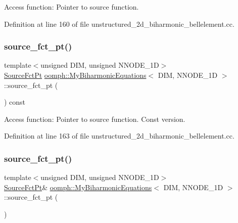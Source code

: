 Access function\+: Pointer to source function. 



Definition at line 160 of file unstructured\+\_\+2d\+\_\+biharmonic\+\_\+bellelement.\+cc.

\mbox{\label{classoomph_1_1MyBiharmonicEquations_a1c2d7933266cf773e3729fb236bc13be}} 
\subsubsection{\texorpdfstring{source\+\_\+fct\+\_\+pt()}{source\_fct\_pt()}\hspace{0.1cm}{\footnotesize\ttfamily [2/4]}}
{\footnotesize\ttfamily template$<$unsigned D\+IM, unsigned N\+N\+O\+D\+E\+\_\+1D$>$ \\
\hyperlink{classoomph_1_1MyBiharmonicEquations_a17bd58054c66229016eb1c52eab36bc1}{Source\+Fct\+Pt} \hyperlink{classoomph_1_1MyBiharmonicEquations}{oomph\+::\+My\+Biharmonic\+Equations}$<$ D\+IM, N\+N\+O\+D\+E\+\_\+1D $>$\+::source\+\_\+fct\+\_\+pt (\begin{DoxyParamCaption}{ }\end{DoxyParamCaption}) const\hspace{0.3cm}{\ttfamily [inline]}}



Access function\+: Pointer to source function. Const version. 



Definition at line 163 of file unstructured\+\_\+2d\+\_\+biharmonic\+\_\+bellelement.\+cc.

\mbox{\label{classoomph_1_1MyBiharmonicEquations_afbb201cb342fef337cfce82a776fa2b3}} 
\subsubsection{\texorpdfstring{source\+\_\+fct\+\_\+pt()}{source\_fct\_pt()}\hspace{0.1cm}{\footnotesize\ttfamily [3/4]}}
{\footnotesize\ttfamily template$<$unsigned D\+IM, unsigned N\+N\+O\+D\+E\+\_\+1D$>$ \\
\hyperlink{classoomph_1_1MyBiharmonicEquations_a17bd58054c66229016eb1c52eab36bc1}{Source\+Fct\+Pt}\& \hyperlink{classoomph_1_1MyBiharmonicEquations}{oomph\+::\+My\+Biharmonic\+Equations}$<$ D\+IM, N\+N\+O\+D\+E\+\_\+1D $>$\+::source\+\_\+fct\+\_\+pt (\begin{DoxyParamCaption}{ }\end{DoxyParamCaption})\hspace{0.3cm}{\ttfamily [inline]}}



